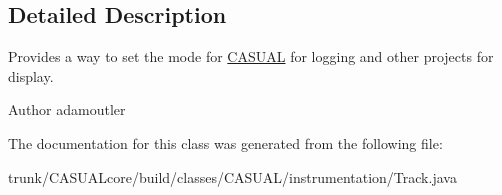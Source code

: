 \subsection{Detailed Description}
Provides a way to set the mode for \hyperlink{namespace_c_a_s_u_a_l}{C\-A\-S\-U\-A\-L} for logging and other projects for display.

\begin{DoxyAuthor}{Author}
adamoutler 
\end{DoxyAuthor}


The documentation for this class was generated from the following file\-:\begin{DoxyCompactItemize}
\item 
trunk/\-C\-A\-S\-U\-A\-Lcore/build/classes/\-C\-A\-S\-U\-A\-L/instrumentation/Track.\-java\end{DoxyCompactItemize}
